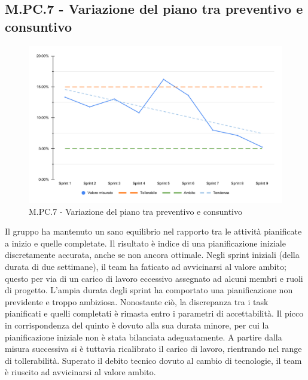 \subsection{M.PC.7 - Variazione del piano tra preventivo e consuntivo}
\begin{figure}[H]
    \centering
    \includegraphics[width=\textwidth]{assets/variazione_task_completati.pdf}
    \caption{M.PC.7 - Variazione del piano tra preventivo e consuntivo}
\end{figure}

\par Il gruppo ha mantenuto un sano equilibrio nel rapporto tra le attività pianificate a inizio  e quelle completate. Il risultato è indice di una pianificazione iniziale discretamente accurata, anche se non ancora ottimale. Negli sprint iniziali (della durata di due settimane), il team ha faticato ad avvicinarsi al valore ambito; questo per via di un carico di lavoro eccessivo assegnato ad alcuni membri e ruoli di progetto. L’ampia durata degli sprint ha comportato una pianificazione non previdente e troppo ambiziosa. Nonostante ciò, la discrepanza tra i task pianificati e quelli completati è rimasta entro i parametri di accettabilità. Il picco in corrispondenza del quinto  è dovuto alla sua durata minore, per cui la pianificazione iniziale non è stata bilanciata adeguatamente. A partire dalla misura successiva si è tuttavia ricalibrato il carico di lavoro, rientrando nel range di tollerabilità. Superato il debito tecnico dovuto al cambio di tecnologie, il team è riuscito ad avvicinarsi al valore ambito.
